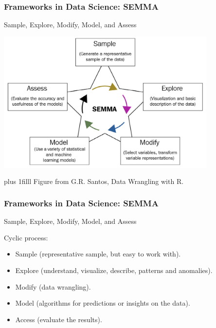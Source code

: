 \documentclass{beamer}
\newcommand{\btVFill}{\vskip0pt plus 1filll}
\begin{document}
	\begin{frame}
		\frametitle{Frameworks in Data Science: SEMMA}

		Sample, Explore, Modify, Model, and Assess

		\includegraphics[width=11cm]{figures/Santos_1_7.png}

		\btVFill
		\tiny{Figure from G.R. Santos, Data Wrangling with R.}

	\end{frame}

	\begin{frame}
		\frametitle{Frameworks in Data Science: SEMMA}

		Sample, Explore, Modify, Model, and Assess

		\vspace{2em}

		Cyclic process:
		\begin{itemize}
			\item Sample (representative sample, but easy to work with).
			\item Explore (understand, visualize, describe, patterns and anomalies).
			\item Modify (data wrangling).
			\item Model (algorithms for predictions or insights on the data).
			\item Access (evaluate the results).
		\end{itemize}

	\end{frame}
\end{document}
